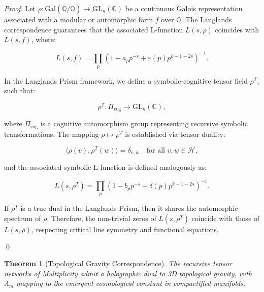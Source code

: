 \documentclass{article}
\theoremstyle{plain}
\newtheorem{theorem}{Theorem}
\begin{document}
\begin{proof}
Let \( \rho: \text{Gal}(\overline{\mathbb{Q}}/\mathbb{Q}) \rightarrow \text{GL}_n(\mathbb{C}) \) be a continuous Galois representation associated with a modular or automorphic form \( f \) over \( \mathbb{Q} \). The Langlands correspondence guarantees that the associated L-function \( L(s, \rho) \) coincides with \( L(s, f) \), where:

\[
L(s, f) = \prod_p (1 - a_p p^{-s} + \varepsilon(p) p^{k-1-2s})^{-1}.
\]

In the Langlands Prism framework, we define a symbolic-cognitive tensor field \( \rho^T \), such that:

\[
\rho^T: \Pi_{\text{cog}} \rightarrow \text{GL}_n(\mathbb{C}),
\]

where \( \Pi_{\text{cog}} \) is a cognitive automorphism group representing recursive symbolic transformations. The mapping \( \rho \mapsto \rho^T \) is established via tensor duality:

\[
\langle \rho(v), \rho^T(w) \rangle = \delta_{v, w} \quad \text{for all } v,w \in \mathcal{H},
\]

and the associated symbolic L-function is defined analogously as:

\[
L(s, \rho^T) = \prod_p (1 - b_p p^{-s} + \delta(p) p^{k-1-2s})^{-1}.
\]

If \( \rho^T \) is a true dual in the Langlands Prism, then it shares the automorphic spectrum of \( \rho \). Therefore, the non-trivial zeros of \( L(s, \rho^T) \) coincide with those of \( L(s, \rho) \), respecting critical line symmetry and functional equations.

\qed
\end{proof}

\begin{theorem}[Topological Gravity Correspondence]
The recursive tensor networks of Multiplicity admit a holographic dual to 3D topological gravity, with \( \Lambda_m \) mapping to the emergent cosmological constant in compactified manifolds.
\end{theorem}
\end{document}
